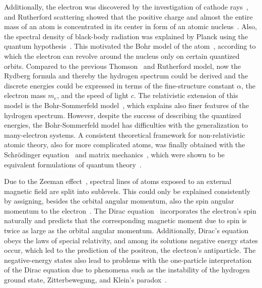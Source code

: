 Additionally, the electron was discovered by the investigation of cathode rays~\cite{thomson1897,rechenberg1997}, and Rutherford scattering showed that the positive charge and almost the entire mass of an atom is concentrated in its center in form of an atomic nucleus~\cite{rutherford1911}. Also, the spectral density of black-body radiation was explained by Planck using the quantum hypothesis~\cite{planck1978}. This motivated the Bohr model of the atom~\cite{bohr1913}, according to which the electron can revolve around the nucleus only on certain quantized orbits. Compared to the previous Thomson~\cite{thomson1904} and Rutherford model, now the Rydberg formula and thereby the hydrogen spectrum could be derived and the discrete energies could be expressed in terms of the fine-structure constant $\alpha$, the electron mass $m_e$, and the speed of light $c$. The relativistic extension of this model is the Bohr-Sommerfeld model~\cite{sommerfeld1916}, which explains also finer features of the hydrogen spectrum.
However, despite the success of describing the quantized energies, the Bohr-Sommerfeld model has difficulties with the generalization to many-electron systems. A consistent theoretical framework for non-relativistic atomic theory, also for more complicated atoms, was finally obtained with the Schrödinger equation~\cite{schrodinger1926_1,schrodinger1926_2,schrodinger1926_3,schrodinger1926_4} and matrix mechanics~\cite{heisenberg1925,born1925,born1926}, which were shown to be equivalent formulations of quantum theory~\cite{schrodinger1926_5}.

Due to the Zeeman effect~\cite{zeeman1896}, spectral lines of atoms exposed to an external magnetic field are split into sublevels. This could only be explained consistently by assigning, besides the orbital angular momentum, also the spin angular momentum to the electron~\cite{uhlenbeck1925}. The Dirac equation~\cite{dirac1928} incorporates the electron's spin naturally and predicts that the corresponding magnetic moment due to spin is twice as large as the orbital angular momentum. Additionally, Dirac's equation obeys the laws of special relativity, and among its solutions negative energy states occur, which led to the prediction of the positron, the electron's antiparticle. The negative-energy states also lead to problems with the one-particle interpretation of the Dirac equation due to phenomena such as the instability of the hydrogen ground state, Zitterbewegung, and Klein's paradox~\cite{the_dirac_eq}.
 
